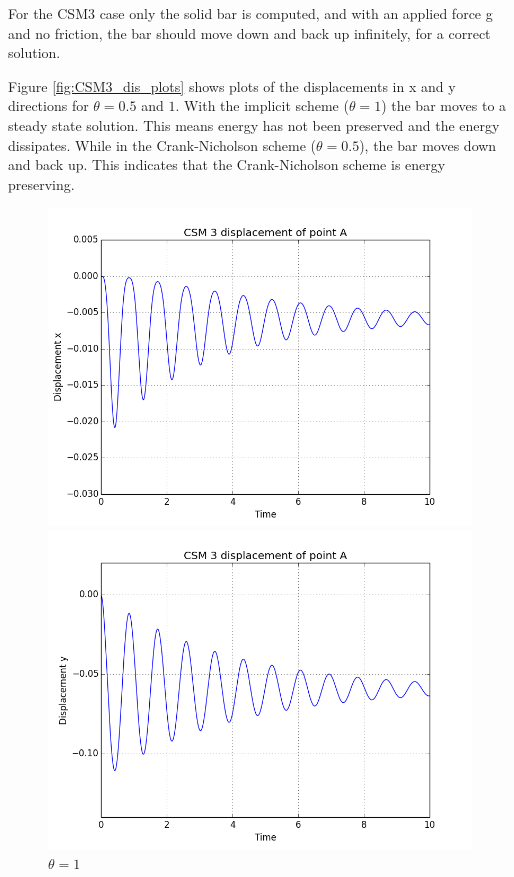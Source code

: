 For the CSM3 case only the solid bar is computed, and with an applied force g and no friction, the bar should move down and back up infinitely, for a correct solution.

Figure \ref{fig:CSM3_dis_plots} shows plots of the displacements in x and y directions for $\theta = 0.5$ and $1$. With the implicit scheme ($\theta=1$) the bar moves to a steady state solution. This means energy has not been preserved and the energy dissipates. While in the Crank-Nicholson scheme ($\theta = 0.5$), the bar moves down and back up. This indicates that the Crank-Nicholson scheme is energy preserving.

\begin{figure}[H] 
  \begin{minipage}[b]{0.6\linewidth}
    \centering
    \includegraphics[scale=0.40]{./Temporal_stability/CSM3_implicit.png} 
    \caption{$\theta = 1 $} 
    \vspace{4ex}
  \end{minipage}%
  \begin{minipage}[b]{0.6\linewidth}
    \centering
    \includegraphics[scale=0.40]{./Temporal_stability/CSM3_implicit_y.png} 

\end{minipage}
\end{figure}
